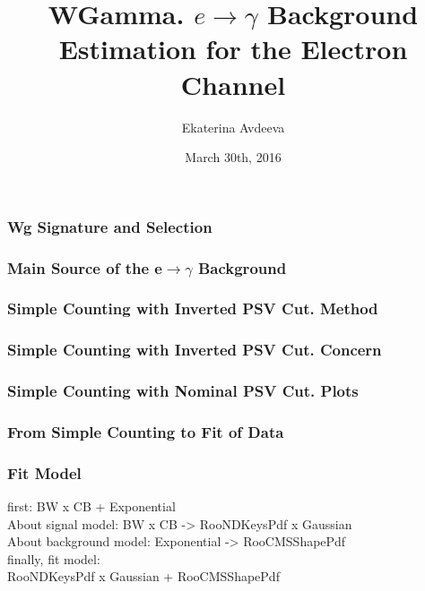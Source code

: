\documentclass{beamer}
\title{WGamma. $e\rightarrow\gamma$ Background Estimation for the Electron Channel}
\author{Ekaterina Avdeeva}
\institute{University of Nebraska - Lincoln}
\date{March 30th, 2016}
\begin{document}
\begin{frame}
\titlepage
\end{frame}

\begin{frame}\frametitle{Wg Signature and Selection}

\end{frame}

\begin{frame}\frametitle{Main Source of the e$\rightarrow\gamma$ Background}

\end{frame}

\begin{frame}\frametitle{Simple Counting with Inverted PSV Cut. Method}

\end{frame}

\begin{frame}\frametitle{Simple Counting with Inverted PSV Cut. Concern}

\end{frame}

\begin{frame}\frametitle{Simple Counting with Nominal PSV Cut. Plots}

\end{frame}

\begin{frame}\frametitle{From Simple Counting to Fit of Data}

\end{frame}

\begin{frame}\frametitle{Fit Model}
\scriptsize
first: BW x CB + Exponential\\
About signal model: BW x CB -> RooNDKeysPdf x Gaussian\\
About background model: Exponential -> RooCMSShapePdf\\
finally, fit model:\\
RooNDKeysPdf x Gaussian + RooCMSShapePdf\\
\end{frame}

\end{document}
